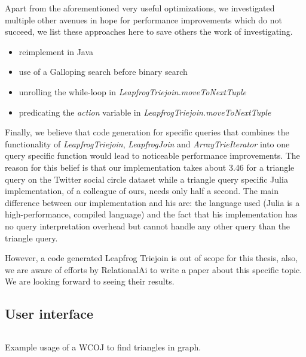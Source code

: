 Apart from the aforementioned very useful optimizations, we investigated multiple other avenues in hope for performance improvements which do not succeed, we list these
approaches here to save others the work of investigating.

\begin{itemize}
\item reimplement in Java
\item use of a Galloping search before binary search
\item unrolling the while-loop in \textit{LeapfrogTriejoin.moveToNextTuple}
\item predicating the \textit{action} variable in \textit{LeapfrogTriejoin.moveToNextTuple}
\end{itemize}


Finally, we believe that code generation for specific queries that combines the functionality of \textit{LeapfrogTriejoin}, \textit{LeapfrogJoin}
and \textit{ArrayTrieIterator} into one query specific function would lead to noticeable performance improvements.
The reason for this belief is that our implementation takes about 3.46 for a triangle query on the Twitter social circle dataset
while a triangle query specific Julia implementation, of a colleague of ours, needs only half a second.
The main difference between our implementation and his are: the language used (Julia is a high-performance, compiled language) and the fact
that his implementation has no query interpretation overhead but cannot handle any other query than the triangle query.

However, a code generated Leapfrog Triejoin is out of scope for this thesis, also, we are aware of efforts by RelationalAi to
write a paper about this specific topic.
We are looking forward to seeing their results.





\subsection{User interface}\label{subsec:user-interface}
\begin{listing}[H]
\inputminted{scala}{code/usage-example.scala}
\caption{Example usage of a WCOJ to find triangles in graph.}
\label{lst:usage-example}
\end{listing}

